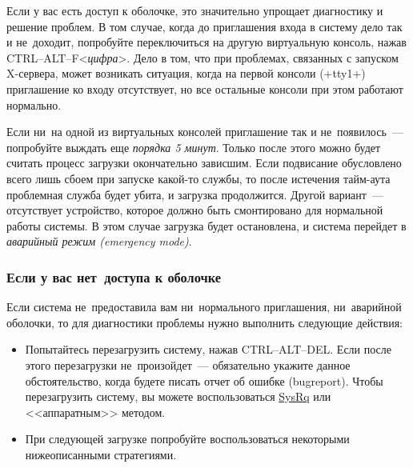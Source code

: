 \documentclass[10pt,oneside,a4paper]{article}
\begin{document}
Если у вас есть доступ к оболочке, это значительно упрощает диагностику и
решение проблем. В том случае, когда до приглашения входа в систему дело так и
не~доходит, попробуйте переключиться на другую виртуальную консоль, нажав
CTRL--ALT--F<\emph{цифра}>. Дело в том, что при проблемах, связанных с запуском
X-сервера, может возникать ситуация, когда на первой консоли (+tty1+)
приглашение ко входу отсутствует, но все остальные консоли при этом работают
нормально.

Если ни~на одной из виртуальных консолей приглашение так и не~появилось~---
попробуйте выждать еще \emph{порядка 5 минут}. Только после этого можно
будет считать процесс загрузки окончательно зависшим. Если подвисание
обусловлено всего лишь сбоем при запуске какой-то службы, то после истечения
тайм-аута проблемная служба будет убита, и загрузка продолжится. Другой
вариант~--- отсутствует устройство, которое должно быть смонтировано для
нормальной работы системы. В этом случае загрузка будет остановлена, и система
перейдет в \emph{аварийный режим (emergency mode)}.

\subsubsection{Если у вас нет~доступа к оболочке}

Если система не~предоставила вам ни~нормального приглашения, ни~аварийной
оболочки, то для диагностики проблемы нужно выполнить следующие действия:
\begin{itemize}
	\item Попытайтесь перезагрузить систему, нажав CTRL--ALT--DEL. Если после
		этого перезагрузки не~произойдет~--- обязательно укажите данное
		обстоятельство, когда будете писать отчет об ошибке (bugreport).
		Чтобы перезагрузить систему, вы можете воспользоваться
		\href{http://fedoraproject.org/wiki/QA/Sysrq}{SysRq} или
		<<аппаратным>> методом.
	\item При следующей загрузке попробуйте воспользоваться некоторыми
		нижеописанными стратегиями.
\end{itemize}
\end{document}
